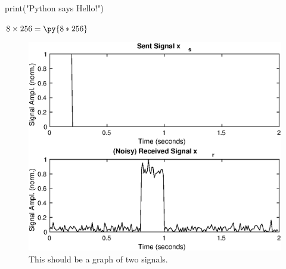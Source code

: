 \documentclass{article}
\newcommand{\pymultiply}[2]{\py{#1*#2}}
\begin{document}
\begin{pycode}
print("Python says Hello!")
\end{pycode}

\(8 \times 256 = \pymultiply{8}{256}\)

\begin{figure}
    \centering
    \includegraphics[width=\textwidth]{signals}
    \caption{This should be a graph of two signals.}
\end{figure}
\end{document}
